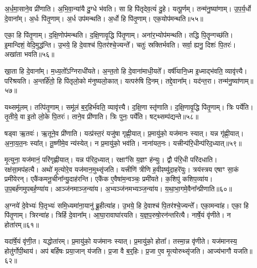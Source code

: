अ॒र्ध॒मा॒साने॒व प्री॑णाति।
अ॒भि॒वा॒न्या॑यै दु॒ग्धे भ॑वति।
सा हि पि॑तृदेव॒त्यं॑ दु॒हे।
यत्पू॒र्णम्।
तन्म॑नु॒ष्या॑णाम्।
उ॒प॒र्य॒र्धो दे॒वाना᳚म्।
अ॒र्धः पि॑तृ॒णाम्।
अ॒र्ध उप॑मन्थति।
अ॒र्धो हि पि॑तृ॒णाम्।
एक॒योप॑मन्थति॥५५॥

एका॒ हि पि॑तृ॒णाम्।
द॒क्षि॒णोप॑मन्थति।
द॒क्षि॒णावृ॒द्धि पि॑तृ॒णाम्।
अना॑र॒भ्योप॑मन्थति।
तद्धि पि॒तॄन्गच्छ॑ति।
इ॒मान्दिशं॒ वेदि॒मुद्ध॑न्ति।
उ॒भये॒ हि दे॒वाश्च॑ पि॒तर॑श्चे॒ज्यन्ते᳚।
चतुः॑ स्रक्तिर्भवति।
सर्वा॒ ह्यनु॒ दिशः॑ पि॒तरः॑।
अखा॑ता भवति॥५६॥

खा॒ता हि दे॒वाना᳚म्।
म॒ध्य॒तो᳚\-ऽग्निराधी॑यते।
अ॒न्त॒तो हि दे॒वाना॑माधी॒यते᳚।
वर्\mbox{}षी॑यानि॒ध्म इ॒ध्माद्भ॑वति॒ व्यावृ॑त्त्यै।
परि॑श्रयति।
अ॒न्तर्\mbox{}हि॑तो॒ हि पि॑तृलो॒को म॑नुष्यलो॒कात्।
यत्परु॑षि दि॒नम्।
तद्दे॒वाना᳚म्।
यद॑न्त॒रा।
तन्म॑नु॒ष्या॑णाम्॥५७॥

यथ्समू॑लम्।
तत्पि॑तृ॒णाम्।
समू॑लं ब॒र्॒हिर्भ॑वति॒ व्यावृ॑त्त्यै।
द॒क्षि॒णा स्तृ॑णाति।
द॒क्षि॒णावृ॒द्धि पि॑तृ॒णाम्।
त्रिः पर्ये॑ति।
तृ॒तीये॒ वा इ॒तो लो॒के पि॒तरः॑।
ताने॒व प्री॑णाति।
त्रिः पुनः॒ पर्ये॑ति।
षट्थ्सम्प॑द्यन्ते॥५८॥

षड्वा ऋ॒तवः॑।
ऋ॒तूने॒व प्री॑णाति।
यत्प्र॑स्त॒रं यजु॑षा गृह्णी॒यात्।
प्र॒मायु॑को॒ यज॑मानः स्यात्।
यन्न गृ॑ह्णी॒यात्।
अ॒ना॒य॒त॒नः स्या᳚त्।
तू॒ष्णीमे॒व न्य॑स्येत्।
न प्र॒मायु॑को॒ भव॑ति।
नाना॑यत॒नः।
यत्त्रीन्प॑रि॒धीन्प॑रिद॒ध्यात्॥५९॥

मृ॒त्युना॒ यज॑मानं॒ परि॑गृह्णीयात्।
यन्न प॑रिद॒ध्यात्।
रक्षाꣳ॑सि य॒ज्ञꣳ ह॑न्युः।
द्वौ प॑रि॒धी परि॑दधाति।
रक्ष॑सा॒मप॑हत्यै।
अथो॑ मृ॒त्योरे॒व यज॑मान॒मुथ्सृ॑जति।
यत्त्रीणि॑ त्रीणि ह॒वीꣴष्यु॑दा॒हरे॑युः।
त्रय॑स्त्रय एषाꣳ सा॒कं प्रमी॑येरन्।
एकै॑कमनू॒चीना᳚न्यु॒दाह॑रन्ति।
एकै॑क ए॒वैषा॑म॒न्वञ्चः॒ प्रमी॑यते।
क॒शिपु॑ कशिप॒व्या॑य।
उ॒प॒बर्\mbox{}ह॑णमुपबर्\mbox{}ह॒ण्या॑य।
आञ्ज॑नमाञ्ज॒न्या॑य।
अ॒भ्यञ्ज॑नमभ्यञ्ज॒न्या॑य।
य॒था॒भा॒गमे॒\-वैना᳚न्प्रीणाति॥६०॥

अ॒ग्नये॑ दे॒वेभ्यः॑ पि॒तृभ्यः॑ समि॒ध्यमा॑ना॒यानु॑ ब्रू॒हीत्या॑ह।
उ॒भये॒ हि दे॒वाश्च॑ पि॒तर॑श्चे॒ज्यन्ते᳚।
एका॒मन्वा॑ह।
एका॒ हि पि॑तृ॒णाम्।
त्रिरन्वा॑ह।
त्रिर्\mbox{}हि दे॒वाना᳚म्।
आ॒घा॒रावाघा॑रयति।
य॒ज्ञ॒प॒रुषो॒रन॑न्तरित्यै।
नार्\mbox{}षे॒यं वृ॑णीते।
न होता॑रम्॥६१॥

यदा॑र्\mbox{}षे॒यं वृ॑णी॒त।
यद्धोता॑रम्।
प्र॒मायु॑को॒ यज॑मानः स्यात्।
प्र॒मायु॑को॒ होता᳚।
तस्मा॒न्न वृ॑णीते।
यज॑मानस्य॒ होतु॑र्गोपी॒थाय॑।
अप॑ बर्\mbox{}हिषः प्रया॒जान् य॑जति।
प्र॒जा वै ब॒र्॒हिः।
प्र॒जा ए॒व मृ॒त्योरुथ्सृ॑जति।
आज्य॑भागौ यजति॥६२॥

